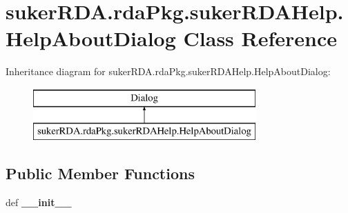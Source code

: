 \hypertarget{classsuker_r_d_a_1_1rda_pkg_1_1suker_r_d_a_help_1_1_help_about_dialog}{\section{suker\+R\+D\+A.\+rda\+Pkg.\+suker\+R\+D\+A\+Help.\+Help\+About\+Dialog Class Reference}
\label{classsuker_r_d_a_1_1rda_pkg_1_1suker_r_d_a_help_1_1_help_about_dialog}
}
Inheritance diagram for suker\+R\+D\+A.\+rda\+Pkg.\+suker\+R\+D\+A\+Help.\+Help\+About\+Dialog\+:\begin{figure}[H]
\begin{center}
\leavevmode
\includegraphics[height=2.000000cm]{classsuker_r_d_a_1_1rda_pkg_1_1suker_r_d_a_help_1_1_help_about_dialog}
\end{center}
\end{figure}
\subsection*{Public Member Functions}
\begin{DoxyCompactItemize}
\item 
\hypertarget{classsuker_r_d_a_1_1rda_pkg_1_1suker_r_d_a_help_1_1_help_about_dialog_aca70ccdf0f4ca44bf502f42d489da61c}{def {\bfseries \+\_\+\+\_\+init\+\_\+\+\_\+}}\label{classsuker_r_d_a_1_1rda_pkg_1_1suker_r_d_a_help_1_1_help_about_dialog_aca70ccdf0f4ca44bf502f42d489da61c}

\end{DoxyCompactItemize}
